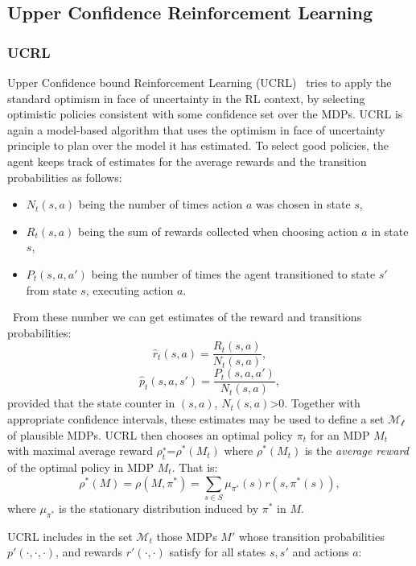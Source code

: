 \subsection{Upper Confidence Reinforcement Learning}

\subsubsection{UCRL}
Upper Confidence bound Reinforcement Learning (UCRL)~\cite{NIPS2006_3052} tries to apply the standard optimism in face of uncertainty in the RL context, by selecting optimistic policies consistent with some confidence set over the MDPs. UCRL is again a model-based algorithm that uses the optimism in face of uncertainty principle to plan over the model it has estimated. To select good policies, the agent keeps track of estimates for the average rewards and the transition probabilities as follows:
\begin{itemize}
\item $N_t(s,a)$ being the number of times action $a$ was chosen in state $s$,
\item $R_t(s,a)$ being the sum of rewards collected when choosing action $a$ in state $s$,
\item $P_t(s,a,a')$ being the number of times the agent transitioned to state $s'$ from state $s$, executing action $a$. 
\end{itemize}\
From these number we can get estimates of the reward and transitions probabilities:
\begin{equation}
	\hat{r}_t(s,a)=\frac{R_t(s,a)}{N_t(s,a)},
\end{equation}
\begin{equation}
	\hat{p}_t(s,a,s')=\frac{P_t(s,a,a')}{N_t(s,a)},
\end{equation}
provided that the state counter in $(s,a)$, $N_t(s,a)$>0. Together with appropriate confidence intervals, these estimates may be used to define a set $\mathcal{M_t}$
of plausible MDPs. UCRL then chooses an optimal policy $\pi_t$ for an MDP $M_{t}$ with maximal average reward $\rho^{∗}_t$=$\rho^*(M_t)$ where $\rho^*(M_t)$ is the \emph{average reward} of the optimal policy in MDP $M_t$. That is:
\begin{equation}
	\rho^*(M)=\rho(M,\pi^*)=\sum_{s\in S} \mu_{\pi^*}(s) r(s,\pi^*(s)),
\end{equation}
where $\mu_{\pi^*}$ is the stationary distribution induced by $\pi^*$ in $M$.\par
UCRL includes in the set $\mathcal{M}_t$ those MDPs $M'$ whose transition probabilities $p'(\cdot,\cdot,\cdot)$, and rewards $r'(\cdot,\cdot)$ satisfy for all states $s,s'$ and actions $a$:
